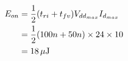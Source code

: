 \subsection{}

\begin{align*}
E_{on} & = \frac{1}{2} (t_{ri} + t_{fv}) V_{dd_{max} } I_{d_{max}} \\
        & = \frac{1}{2} (100n+50n) \times 24 \times 10 \\
        & = \unit[18]{\mu{}J}
\end{align*}